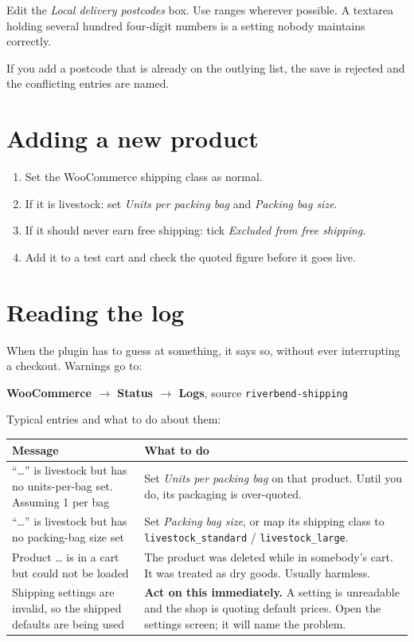 \documentclass[11pt,a4paper,oneside]{report}
\newcommand{\opt}[1]{\texttt{\small #1}}
\newcommand{\menu}[1]{\textsf{\textbf{#1}}}
\begin{document}
Edit the \emph{Local delivery postcodes} box. Use ranges wherever possible. A
textarea holding several hundred four-digit numbers is a setting nobody maintains
correctly.

If you add a postcode that is already on the outlying list, the save is rejected and
the conflicting entries are named.

\section{Adding a new product}

\begin{enumerate}
  \item Set the WooCommerce shipping class as normal.
  \item If it is livestock: set \emph{Units per packing bag} and \emph{Packing bag
        size}.
  \item If it should never earn free shipping: tick \emph{Excluded from free
        shipping}.
  \item Add it to a test cart and check the quoted figure before it goes live.
\end{enumerate}

\section{Reading the log}

When the plugin has to guess at something, it says so, without ever interrupting a
checkout. Warnings go to:

\begin{center}
\menu{WooCommerce $\rightarrow$ Status $\rightarrow$ Logs}, source \opt{riverbend-shipping}
\end{center}

Typical entries and what to do about them:

\begin{longtable}{@{}L{7.2cm}L{7.6cm}@{}}
\toprule
\textbf{Message} & \textbf{What to do}\\
\midrule
\endhead
\textsf{``\dots'' is livestock but has no units-per-bag set. Assuming 1 per bag} &
Set \emph{Units per packing bag} on that product. Until you do, its packaging is
over-quoted.\\
\addlinespace
\textsf{``\dots'' is livestock but has no packing-bag size set} &
Set \emph{Packing bag size}, or map its shipping class to
\opt{livestock\_standard} / \opt{livestock\_large}.\\
\addlinespace
\textsf{Product \dots{} is in a cart but could not be loaded} &
The product was deleted while in somebody's cart. It was treated as dry goods.
Usually harmless.\\
\addlinespace
\textsf{Shipping settings are invalid, so the shipped defaults are being used} &
\textbf{Act on this immediately.} A setting is unreadable and the shop is quoting
default prices. Open the settings screen; it will name the problem.\\
\bottomrule
\end{longtable}
\end{document}
